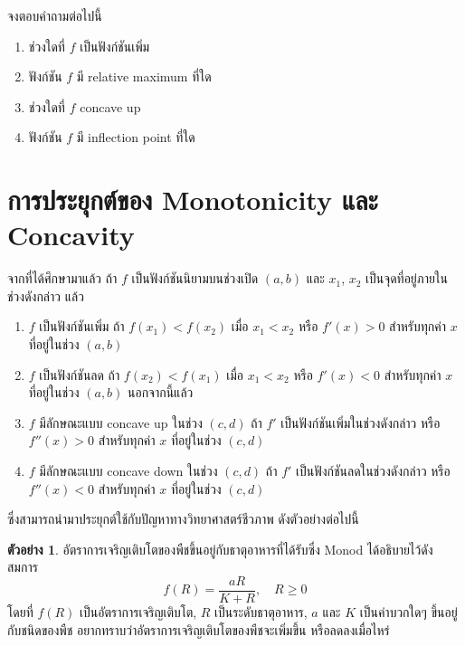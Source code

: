 \documentclass[
]{book}
\theoremstyle{definition}
\theoremstyle{definition}
\newtheorem{example}{ตัวอย่าง}[chapter]
\theoremstyle{definition}
\theoremstyle{definition}
\theoremstyle{remark}
\begin{document}
จงตอบคำถามต่อไปนี้

\begin{enumerate}
\def\labelenumi{\arabic{enumi}.}
\item
  ช่วงใดที่ \(f\) เป็นฟังก์ชันเพิ่ม
\item
  ฟังก์ชัน \(f\) มี relative maximum ที่ใด
\item
  ช่วงใดที่ \(f\) concave up
\item
  ฟังก์ชัน \(f\) มี inflection point ที่ใด
\end{enumerate}

\section{การประยุกต์ของ Monotonicity และ Concavity}\label{uxe01uxe32uxe23uxe1buxe23uxe30uxe22uxe01uxe15uxe02uxe2duxe07-monotonicity-uxe41uxe25uxe30-concavity}

จากที่ได้ศึกษามาแล้ว ถ้า \(f\) เป็นฟังก์ชันนิยามบนช่วงเปิด \((a,b)\) และ \(x_1\), \(x_2\)
เป็นจุดที่อยู่ภายในช่วงดังกล่าว แล้ว

\begin{enumerate}
\def\labelenumi{(\arabic{enumi})}
\item
  \(f\) เป็นฟังก์ชันเพิ่ม ถ้า \(f(x_1)<f(x_2)\) เมื่อ \(x_1<x_2\) หรือ \(f'(x)>0\)
  สำหรับทุกค่า \(x\) ที่อยู่ในช่วง \((a,b)\)
\item
  \(f\) เป็นฟังก์ชันลด ถ้า \(f(x_2)<f(x_1)\) เมื่อ \(x_1<x_2\) หรือ \(f'(x)<0\)
  สำหรับทุกค่า \(x\) ที่อยู่ในช่วง \((a,b)\) นอกจากนี้แล้ว
\item
  \(f\) มีลักษณะแบบ concave up ในช่วง \((c,d)\) ถ้า \(f'\)
  เป็นฟังก์ชันเพิ่มในช่วงดังกล่าว หรือ \(f''(x)>0\) สำหรับทุกค่า \(x\) ที่อยู่ในช่วง \((c,d)\)
\item
  \(f\) มีลักษณะแบบ concave down ในช่วง \((c,d)\) ถ้า \(f'\)
  เป็นฟังก์ชันลดในช่วงดังกล่าว หรือ \(f''(x)<0\) สำหรับทุกค่า \(x\) ที่อยู่ในช่วง \((c,d)\)
\end{enumerate}

ซึ่งสามารถนำมาประยุกต์ใช้กับปัญหาทางวิทยาศาสตร์ชีวภาพ ดังตัวอย่างต่อไปนี้

\begin{example}
อัตราการเจริญเติบโตของพืชขึ้นอยู่กับธาตุอาหารที่ได้รับซึ่ง Monod ได้อธิบายไว้ดังสมการ
\[f(R)=\frac{aR}{K+R}, \quad R \ge 0\] โดยที่ \(f(R)\) เป็นอัตราการเจริญเติบโต,
\(R\) เป็นระดับธาตุอาหาร, \(a\) และ \(K\) เป็นค่าบวกใดๆ ขึ้นอยู่กับชนิดของพืช
อยากทราบว่าอัตราการเจริญเติบโตของพืชจะเพิ่มขึ้น หรือลดลงเมื่อไหร่
\end{example}
\end{document}
